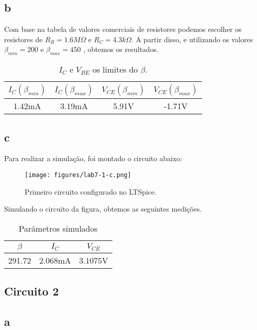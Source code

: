 \documentclass[a4paper]{report}
\begin{document}
\subsection*{b}
Com base na tabela de valores comerciais de resistores podemos escolher os resistores de $R_B = 1.6M \Omega$ e  $R_C = 4.3k \Omega$. A partir disso, e utilizando os valores  $\beta_{min} = 200 $ e $\beta_{max} = 450$ , obtemos os resultados.
\begin{table}[!h]
    \centering
    \begin{tabular}{|c|c|c|c|}
    \hline
    $I_C(\beta_{min})$	&	$I_C(\beta_{max})$	&	$V_{CE}(\beta_{min})$	&	$V_{CE}(\beta_{max})$	\\	\hline
1.42mA	&	3.19mA	&	5.91V	&	-1.71V	\\	\hline
    \end{tabular}
    \caption{$I_C$ e $V_{BE}$ os limites do $\beta$.}
    \label{tab:Q1}
\end{table}

\subsection*{c}

Para realizar a simulação, foi montado o circuito abaixo:

\begin{figure}[H]
    \centering
    \texttt{[image: figures/lab7-1-c.png]}
    \caption{Primeiro circuito configurado no LTSpice.}
    \label{fig:figures-lab7-1-c-png}
\end{figure}

Simulando o circuito da figura, obtemos as seguintes medições.
\begin{table}[!h]
    \centering
    \begin{tabular}{|c|c|c|}
\hline
$\beta$	&	$I_C$	&	$V_{CE}$	\\	\hline
291.72	&	2.068mA	&	3.1075V	\\	\hline

    \end{tabular}
    \caption{Parâmetros simulados }
    \label{tab:Q1c}
\end{table}
\subsection*{Circuito 2}

\subsection*{a}
\end{document}
